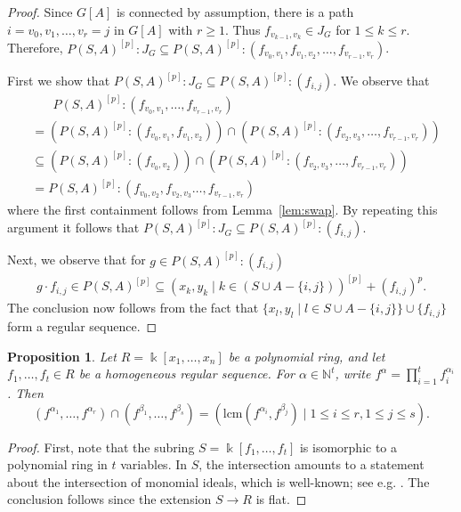 \documentclass[12pt,a4paper]{amsart}
\theoremstyle{plain}
\newtheorem{prop}[thrm]{Proposition}
\theoremstyle{definition}
\theoremstyle{remark}
\def\kk{\Bbbk}
\renewcommand{\subset}{\subseteq}
\begin{document}
\begin{proof}
    Since $G[A]$ is connected by assumption, there is a path $i = v_0,v_1,\ldots,v_r = j$ in $G[A]$ with $r \geq 1$.  Thus $f_{v_{k-1},v_k} \in J_G$ for $1 \le k \le r$.  Therefore, $P(S,A)^{[p]}:J_G \subseteq P(S,A)^{[p]}:(f_{v_0,v_1},f_{v_1,v_2},\ldots,f_{v_{r-1},v_r})$.  
    
    First we show that $P(S,A)^{[p]}:J_G \subseteq P(S,A)^{[p]}:(f_{i,j})$. We observe that
    \begin{align*}
        &\phantom{=(} P(S,A)^{[p]}:(f_{v_0,v_1},\ldots,f_{v_{r-1},v_r}) \\&= \left( P(S,A)^{[p]}:(f_{v_0,v_1},f_{v_1,v_2}) \right) \cap \left( P(S,A)^{[p]}:(f_{v_2,v_3},\ldots,f_{v_{r-1},v_r})\right) \\
        &\subseteq  \left( P(S,A)^{[p]}:(f_{v_0,v_2})\right) \cap \left(P(S,A)^{[p]}:(f_{v_2,v_3},\ldots,f_{v_{r-1},v_r}) \right)\\
        &= P(S,A)^{[p]}:(f_{v_0,v_2},f_{v_2,v_3}\ldots,f_{v_{r-1},v_r})
    \end{align*}
    where the first containment follows from Lemma~\ref{lem:swap}. By repeating this argument it follows that $P(S,A)^{[p]}:J_G \subseteq P(S,A)^{[p]}:(f_{i,j})$.
    
    Next, we observe that for $g \in P(S,A)^{[p]}:(f_{i,j})$
    \begin{align*}
        g \cdot f_{i,j} \in P(S,A)^{[p]} \subset (x_k,y_k\mid k \in (S \cup A - \{i,j\}))^{[p]} + (f_{i,j})^{p}.
    \end{align*}
    The conclusion now follows from the fact that $\{x_l,y_l \mid l \in S \cup A - \{i,j\}\} \cup \{f_{i,j}\}$ form a regular sequence.
\end{proof}

\begin{prop}\label{prop:reg:sequence}
    Let $R = \kk[x_1,\ldots,x_n]$ be a polynomial ring, and let $f_1,\ldots,f_t \in R$ be a homogeneous regular sequence.  For $\alpha \in \mathbb{N}^t$, write $f^\alpha = \prod_{i = 1}^t f_i^{\alpha_i}$.  Then \[(f^{\alpha_1},\ldots,f^{\alpha_r}) \cap (f^{\beta_1},\ldots,f^{\beta_s}) = (\mathrm{lcm}(f^{\alpha_i},f^{\beta_j}) \mid 1 \le i \le r, 1 \le j \le s).\]
\end{prop}

\begin{proof}
    First, note that the subring $S = \kk[f_1,\ldots,f_t]$ is isomorphic to a polynomial ring in $t$ variables.  In $S$, the intersection amounts to a statement about the intersection of monomial ideals, which is well-known; see e.g. \cite[Proposition 2.1.5]{MRSW2018}.  The conclusion follows since the extension $S \to R$ is flat.
\end{proof}
\end{document}
